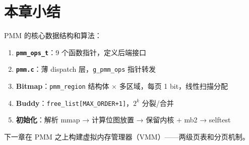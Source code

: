 \section{本章小结}

PMM 的核心数据结构和算法：

\begin{enumerate}
  \item \textbf{\texttt{pmm\_ops\_t}}：9 个函数指针，定义后端接口
  \item \textbf{\texttt{pmm.c}}：薄 dispatch 层，\texttt{g\_pmm\_ops} 指针转发
  \item \textbf{Bitmap}：\texttt{pmm\_region} 结构体 × 多区域，每页 1 bit，线性扫描分配
  \item \textbf{Buddy}：\texttt{free\_list[MAX\_ORDER+1]}，$2^k$ 分裂/合并
  \item \textbf{初始化}：解析 mmap → 计算位图放置 → 保留内核 + mb2 → selftest
\end{enumerate}

下一章在 PMM 之上构建虚拟内存管理器（VMM）——两级页表和分页机制。

